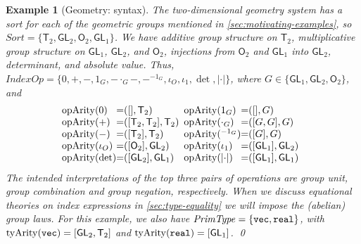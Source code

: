 \documentclass{sigplanconf}
\newcommand{\abs}[1]{\lvert #1 \rvert}
\newcommand{\SynGL}[1]{\mathsf{GL}_#1}
\newcommand{\SynOrth}[1]{\mathsf{O}_#1}
\newcommand{\SynTransl}[1]{\mathsf{T}_#1}
\newcommand{\SortSet}{\mathit{Sort}}
\newcommand{\IndexOpSet}{\mathit{IndexOp}}
\newcommand{\PrimTypeSet}{\mathit{PrimType}}
\newcommand{\tyPrimNm}[1]{\textup{\texttt{#1}}}
\newcommand{\primTyArity}{\mathrm{tyArity}}
\newcommand{\indexOpArity}{\mathrm{opArity}}
\theoremstyle{examplestyle}
\newtheorem*{example*}{Example}
\theoremstyle{restatementstyle}
\begin{document}
\begin{example*}[Geometry: syntax]
  \label{ex:two-dim-geo-operations}
  The two-dimensional geometry system has a sort for each of the
  geometric groups mentioned in \autoref{sec:motivating-examples}, so
  $\SortSet = \{\SynTransl{2}, \SynGL{2}, \SynOrth{2}, \SynGL{1} \}$.
  We have additive group structure on $\SynTransl{2}$, multiplicative
  group structure on $\SynGL{1}$, $\SynGL{2}$, and $\SynOrth{2}$,
  injections from $\SynOrth{2}$ and $\SynGL{1}$ into $\SynGL{2}$,
  determinant, and absolute value. Thus, $\IndexOpSet = \{ 0, +, -,
  1_G, -\cdot_G-, -^{-1_G}, \iota_O, \iota_1, \det, \abs{\cdot} \}$, where
  $G \in \{\SynGL{1}, \SynGL{2}, \SynOrth{2}\}$, and
  \begin{displaymath}
    \begin{array}{@{}l@{\hspace{0em}=\hspace{0em}}l@{\hspace{0.5em}}l@{\hspace{0em}=\hspace{0em}}l}
      \indexOpArity(0) & ([], \SynTransl{2}) &
      \indexOpArity(1_G) & ([], G) \\
      \indexOpArity(+) & ([\SynTransl{2}, \SynTransl{2}], \SynTransl{2}) &
      \indexOpArity(\cdot_G) & ([G,G],G) \\
      \indexOpArity(-) & ([\SynTransl{2}], \SynTransl{2}) &
      \indexOpArity(^{-1_G}) & ([G], G) \\
      \indexOpArity(\iota_O) & ([\SynOrth{2}], \SynGL{2}) &
      \indexOpArity(\iota_1) & ([\SynGL{1}], \SynGL{2}) \\
      \indexOpArity(\det) & ([\SynGL{2}], \SynGL{1}) &
      \indexOpArity(\abs{\cdot}) & ([\SynGL{1}], \SynGL{1})
    \end{array}
  \end{displaymath}
  The intended interpretations of the top three pairs of operations
  are group unit, group combination and group negation,
  respectively. 
  When we discuss equational theories on index expressions 
in \autoref{sec:type-equality} 
we will impose the (abelian) group laws. For this example, 
we also have $\PrimTypeSet = \{ \tyPrimNm{vec},
  \tyPrimNm{real} \}$, with $\primTyArity(\tyPrimNm{vec}) =
           [\SynGL{2}, \SynTransl{2}]$ and
           $\primTyArity(\tyPrimNm{real}) = [\SynGL{1}]$.
\qed
\end{example*}
\end{document}

